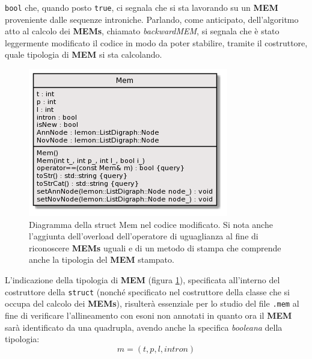 \documentclass[a4paper,12pt, oneside]{book}
\begin{document}
\texttt{bool} che, quando posto \texttt{true}, ci segnala che si sta lavorando
su un \textbf{MEM} proveniente dalle sequenze introniche. Parlando, come
anticipato, dell'algoritmo atto al calcolo dei \textbf{MEMs}, chiamato
\textit{backwardMEM}, si segnala che è stato leggermente modificato il codice in
modo da poter stabilire, tramite il costruttore, quale tipologia di \textbf{MEM}
si sta calcolando. 
\begin{figure}
  \centering
  \includegraphics[scale = 0.75]{img/memIntron.png}
  \caption{Diagramma della struct Mem nel codice modificato. Si nota anche
    l'aggiunta dell'overload dell'operatore di uguaglianza al fine di
    riconoscere \textbf{MEMs} uguali e di un metodo di stampa che comprende
    anche la tipologia del \textbf{MEM} stampato.}
  \label{si}
\end{figure}
L'indicazione della tipologia di \textbf{MEM} (figura \ref{si}), specificata
all'interno del 
costruttore della \texttt{struct} (nonché specificato nel costruttore della
classe che si occupa del calcolo dei \textbf{MEMs}), risulterà essenziale per lo
studio del file \texttt{.mem} al fine di verificare l'allineamento con esoni non
annotati in quanto ora il \textbf{MEM} sarà identificato da una quadrupla,
avendo anche la specifica \textit{booleana} della tipologia:
\[m=(t,p,l, intron)\]
\end{document}
